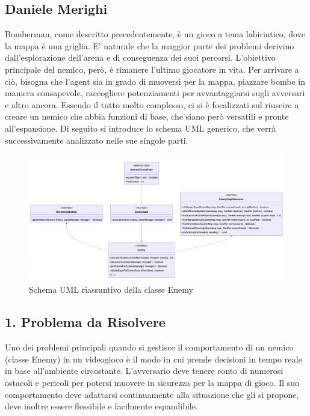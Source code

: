 \documentclass[a4paper,12pt]{report}
\begin{document}
\subsection{Daniele Merighi}

\par
Bomberman, come descritto precedentemente, è un gioco a tema labirintico, dove la mappa è una griglia. E’ naturale che la maggior parte dei problemi derivino dall'esplorazione dell’arena e di conseguenza dei suoi percorsi. L’obiettivo principale del nemico, però, è rimanere l’ultimo giocatore in vita. Per arrivare a ciò, bisogna che l’agent sia in grado di muoversi per la mappa, piazzare bombe in maniera consapevole, raccogliere potenziamenti per avvantaggiarsi sugli avversari e altro ancora. Essendo il tutto molto complesso, ci si è focalizzati sul riuscire a creare un nemico che abbia funzioni di base, che siano però versatili e pronte all’espansione. Di seguito si introduce lo schema UML generico, che verrà successivamente analizzato nelle sue singole parti.

\begin{figure}[h]
\centering{}
\includegraphics[width=\textwidth]{img/enemyGenerics.png}
\caption{Schema UML riassuntivo della classe Enemy}
\end{figure}

\subsection*{1. Problema da Risolvere}
\par
Uno dei problemi principali quando si gestisce il comportamento di un nemico (classe Enemy) in un videogioco è il modo in cui prende decisioni in tempo reale in base all'ambiente circostante. L’avversario deve tenere conto di numerosi ostacoli e pericoli per potersi muovere in sicurezza per la mappa di gioco. Il suo comportamento deve adattarsi continuamente alla situazione che gli si propone, deve inoltre essere flessibile e facilmente espandibile. 
\end{document}
